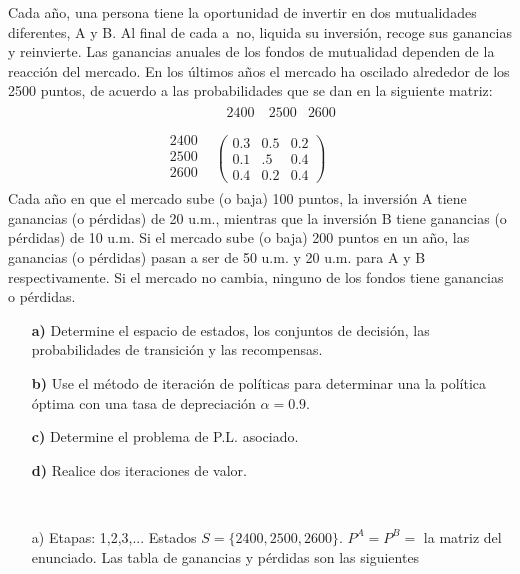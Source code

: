 \documentclass[twoside]{article}
\begin{document}
\begin{ejercicio}{3}

Cada año, una persona tiene la oportunidad de invertir en dos mutualidades diferentes, A y B.
Al final de cada a~no, liquida su inversión, recoge sus ganancias y reinvierte. Las ganancias anuales
de los fondos de mutualidad dependen de la reacción del mercado. En los últimos años el mercado
ha oscilado alrededor de los 2500 puntos, de acuerdo a las probabilidades que se dan en la siguiente
matriz:
\[
\begin{array}{cc}
  \begin{matrix}
 
\end{matrix} & \begin{matrix}
~~2400 & ~2500 & 2600~  & \\ 
\end{matrix} \\
\begin{matrix}
2400 \\
2500 \\
2600 \\
\end{matrix}
 & \begin{pmatrix}
0.3 & 0.5 & 0.2 \\
0.1 & .5 & 0.4 \\
0.4 & 0.2 & 0.4
\end{pmatrix}
\end{array}
\]
Cada año en que el mercado sube (o baja) 100 puntos, la inversión A tiene ganancias (o pérdidas)
de 20 u.m., mientras que la inversión B tiene ganancias (o pérdidas) de 10 u.m. Si el mercado sube
(o baja) 200 puntos en un año, las ganancias (o pérdidas) pasan a ser de 50 u.m. y 20 u.m. para A
y B respectivamente. Si el mercado no cambia, ninguno de los fondos tiene ganancias o pérdidas.
\begin{itemize}
\item[\textbf{a)}] Determine el espacio de estados, los conjuntos de decisión, las probabilidades de transición y
las recompensas.
\item[\textbf{b)}] Use el método de iteración de políticas para determinar una la política óptima con una tasa de
depreciación $\alpha = 0.9$.
\item[\textbf{c)}] Determine el problema de P.L. asociado.
\item[\textbf{d)}] Realice dos iteraciones de valor.
\end{itemize}

\begin{solucion}\
\begin{itemize}
\item[a)] Etapas: 1,2,3,... Estados $S=\{2400,2500,2600\}$. $P^A=P^B=$ la matriz del enunciado. Las tabla de ganancias y pérdidas son las siguientes


\end{itemize}
\end{solucion}
\end{ejercicio}
\end{document}
